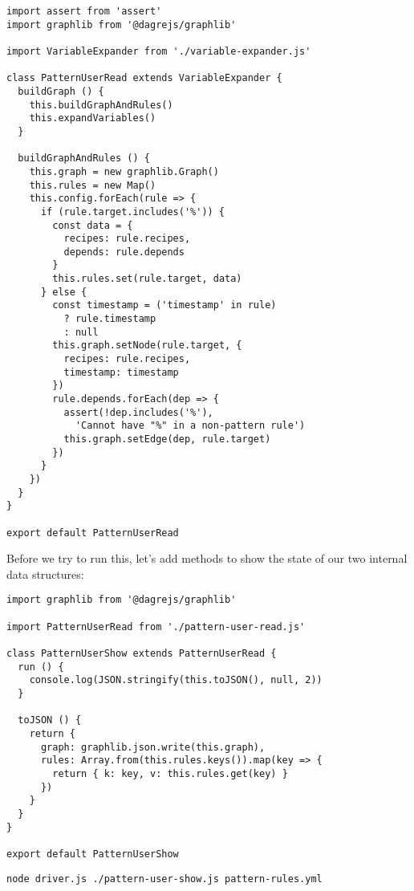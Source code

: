 \documentclass[krantzl]{krantz}
\begin{document}
\begin{lstlisting}[frame=single,frameround=tttt]
import assert from 'assert'
import graphlib from '@dagrejs/graphlib'

import VariableExpander from './variable-expander.js'

class PatternUserRead extends VariableExpander {
  buildGraph () {
    this.buildGraphAndRules()
    this.expandVariables()
  }

  buildGraphAndRules () {
    this.graph = new graphlib.Graph()
    this.rules = new Map()
    this.config.forEach(rule => {
      if (rule.target.includes('%')) {
        const data = {
          recipes: rule.recipes,
          depends: rule.depends
        }
        this.rules.set(rule.target, data)
      } else {
        const timestamp = ('timestamp' in rule)
          ? rule.timestamp
          : null
        this.graph.setNode(rule.target, {
          recipes: rule.recipes,
          timestamp: timestamp
        })
        rule.depends.forEach(dep => {
          assert(!dep.includes('%'),
            'Cannot have "%" in a non-pattern rule')
          this.graph.setEdge(dep, rule.target)
        })
      }
    })
  }
}

export default PatternUserRead
\end{lstlisting}



Before we try to run this,
let's add methods to show the state of our two internal data structures:


\begin{lstlisting}[frame=single,frameround=tttt]
import graphlib from '@dagrejs/graphlib'

import PatternUserRead from './pattern-user-read.js'

class PatternUserShow extends PatternUserRead {
  run () {
    console.log(JSON.stringify(this.toJSON(), null, 2))
  }

  toJSON () {
    return {
      graph: graphlib.json.write(this.graph),
      rules: Array.from(this.rules.keys()).map(key => {
        return { k: key, v: this.rules.get(key) }
      })
    }
  }
}

export default PatternUserShow
\end{lstlisting}



\begin{lstlisting}[frame=single,frameround=tttt]
node driver.js ./pattern-user-show.js pattern-rules.yml
\end{lstlisting}
\end{document}
